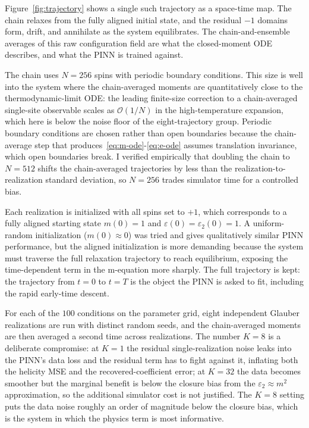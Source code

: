 \documentclass[conference]{IEEEtran}
\newcommand{\eps}{\varepsilon}
\newcommand{\epstwo}{\varepsilon_2}
\begin{document}
Figure~\ref{fig:trajectory} shows a single such trajectory as a
space-time map. The chain relaxes from the fully aligned initial
state, and the residual $-1$ domains form, drift, and annihilate as
the system equilibrates. The chain-and-ensemble averages of this raw
configuration field are what the closed-moment ODE describes, and
what the PINN is trained against.




The chain uses $N = 256$ spins with periodic boundary conditions. This size is
well into the system where the chain-averaged moments are quantitatively
close to the thermodynamic-limit ODE: the leading finite-size correction
to a chain-averaged single-site observable scales as $\mathcal{O}(1/N)$
in the high-temperature expansion, which here is below the noise floor
of the eight-trajectory group. Periodic boundary conditions are
chosen rather than open boundaries because the chain-average step that
produces~\eqref{eq:m-ode}-\eqref{eq:e-ode} assumes translation
invariance, which open boundaries break. I verified empirically
that doubling the chain to $N = 512$ shifts the chain-averaged
trajectories by less than the realization-to-realization standard
deviation, so $N = 256$ trades simulator time for a controlled bias.


Each realization is initialized with all spins set to $+1$, which
corresponds to a fully aligned starting state $m(0) = 1$ and
$\eps(0) = \epstwo(0) = 1$. A uniform-random initialization
($m(0) \approx 0$) was tried and gives qualitatively similar PINN
performance, but the aligned initialization is more demanding because
the system must traverse the full relaxation trajectory to reach
equilibrium, exposing the time-dependent term in the m-equation more
sharply. The full trajectory is kept: the trajectory from
$t = 0$ to $t = T$ is the object the PINN is asked to fit, including
the rapid early-time descent.


For each of the $100$ conditions on the parameter grid, eight
independent Glauber realizations are run with distinct random seeds, and
the chain-averaged moments are then averaged a second time across
realizations. The number $K = 8$ is a deliberate compromise: at
$K = 1$ the residual single-realization noise leaks into the
PINN's data loss and the residual term has to fight against it,
inflating both the helicity MSE and the recovered-coefficient
error; at $K = 32$ the data becomes smoother but the marginal benefit
is below the closure bias from the
$\epstwo \!\approx\! m^2$ approximation, so the additional simulator
cost is not justified. The $K = 8$ setting puts the data noise
roughly an order of magnitude below the closure bias, which is the
system in which the physics term is most informative.
\end{document}
